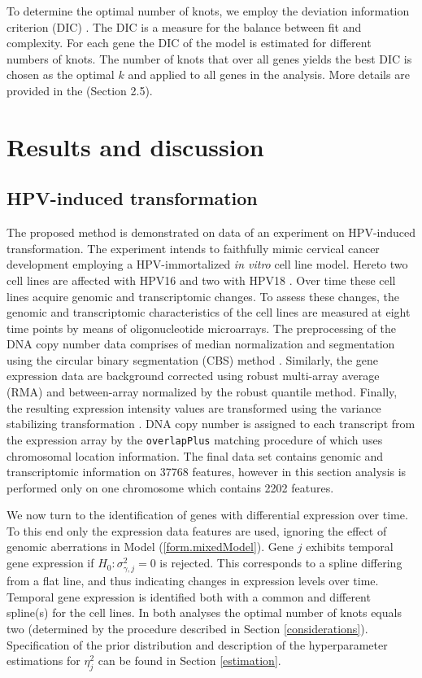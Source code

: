 To determine the optimal number of knots, we employ the deviation information criterion (DIC) \cite{Spiegelhalter2002}. The DIC is a measure for the balance between fit and complexity. For each gene the DIC of the model is estimated for different numbers of knots. The number of knots that over all genes yields the best DIC is chosen as the optimal $k$ and applied to all genes in the analysis. More details are provided in the \cite{Supp2018} (Section 2.5).


\section{Results and discussion}
\subsection{HPV-induced transformation}
\label{cervical}
The proposed method is demonstrated on data of an experiment on HPV-induced transformation. The experiment intends to faithfully mimic cervical cancer development employing a HPV-immortalized {\it in vitro} cell line model. Hereto two cell lines are affected with HPV16 and two with HPV18 \cite{Steenbergen1996}. Over time these cell lines acquire genomic and transcriptomic changes. To assess these changes, the genomic and transcriptomic characteristics of the cell lines are measured at eight time points by means of oligonucleotide microarrays. The preprocessing of the DNA copy number data comprises of median normalization and segmentation using the circular binary segmentation (CBS) method \cite{Olshen2004}. Similarly, the gene expression data are background corrected using robust multi-array average (RMA) \cite{Irizarry2003} and between-array normalized by the robust quantile method. Finally, the resulting expression intensity values are transformed using the variance stabilizing transformation \cite{Huber2002}. DNA copy number is assigned to each transcript from the expression array by the {\tt overlapPlus} matching procedure of \cite{Wieringen2012} which uses chromosomal location information. The final data set contains genomic and transcriptomic information on 37768 features, however in this section analysis is performed only on one chromosome which contains 2202 features.

We now turn to the identification of genes with differential expression over time. To this end only the expression data features are used, ignoring the effect of genomic aberrations in Model (\ref{form.mixedModel}). Gene $j$ exhibits temporal gene expression if $H_0 : \sigma^2_{\gamma,j} = 0$ is rejected. This corresponds to a spline differing from a flat line, and thus indicating changes in expression levels over time. Temporal gene expression is identified both with a common and different spline(s) for the cell lines. In both analyses the optimal number of knots equals two (determined by the procedure described in Section \ref{considerations}). Specification of the prior distribution and description of the hyperparameter estimations for $\eta_j^{2}$ can be found in Section \ref{estimation}.

